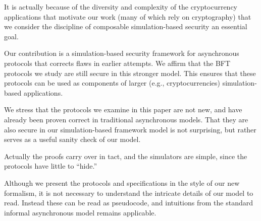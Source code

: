 It is actually because of the diversity and complexity of the cryptocurrency applications that motivate our work (many of which rely on cryptography) that we consider the discipline of composable simulation-based security an essential goal.

Our contribution is a simulation-based security framework for asynchronous protocols that corrects flaws in earlier attempts. We affirm that the BFT protocols we study are still secure in this stronger model. This ensures that these protocols can be used as components of larger (e.g., cryptocurrencies) simulation-based applications.

We stress that the protocols we examine in this paper are not new, and have already been proven correct in traditional asynchronous models.
That they are also secure in our simulation-based framework model is not surprising, but rather serves as a useful sanity check of our model.

Actually the proofs carry over in tact, and the simulators are simple, since the protocols have little to ``hide.''

Although we present the protocols and specifications in the style of our new formalism, it is not necessary to understand the intricate details of our model to read.
Instead these can be read as pseudocode, and intuitions from the standard informal asynchronous model remains applicable.

